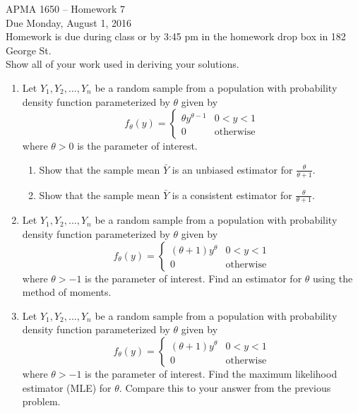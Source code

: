 \documentclass[12pt]{article}
\begin{document}
\title{}
\author{\vspace{-10ex} }

\begin{center}
{\LARGE APMA 1650 -- Homework 7}\\
\vspace{5mm}
{\large Due Monday, August 1, 2016}\\
\vspace{5mm}
Homework is due during class or by 3:45 pm in the homework drop box in 182 George St.\\
Show all of your work used in deriving your solutions.
\end{center}

\begin{enumerate}

\item Let $Y_1, Y_2, \dots, Y_n$ be a random sample from a population with probability density function parameterized by $\theta$ given by
\[
f_\theta(y) = \begin{cases}
\theta y^{\theta - 1} & 0 < y < 1 \\
0 & \text{otherwise}
\end{cases}
\]
where $\theta > 0$ is the parameter of interest. 
\begin{enumerate}
\item Show that the sample mean $\bar{Y}$ is an unbiased estimator for $\frac{\theta}{\theta + 1}$.
\item Show that the sample mean $\bar{Y}$ is a consistent estimator for $\frac{\theta}{\theta + 1}$.
\end{enumerate}

\item Let $Y_1, Y_2, \dots, Y_n$ be a random sample from a population with probability density function parameterized by $\theta$ given by
\[
f_\theta(y) = \begin{cases}
(\theta + 1)y^\theta & 0 < y < 1 \\
0 & \text{otherwise}
\end{cases}
\]
where $\theta > -1$ is the parameter of interest. Find an estimator for $\theta$ using the method of moments.

\item Let $Y_1, Y_2, \dots, Y_n$ be a random sample from a population with probability density function parameterized by $\theta$ given by
\[
f_\theta(y) = \begin{cases}
(\theta + 1)y^\theta & 0 < y < 1 \\
0 & \text{otherwise}
\end{cases}
\]
where $\theta > -1$ is the parameter of interest. Find the maximum likelihood estimator (MLE) for $\theta$. Compare this to your answer from the previous problem.


\end{enumerate}
\end{document}
